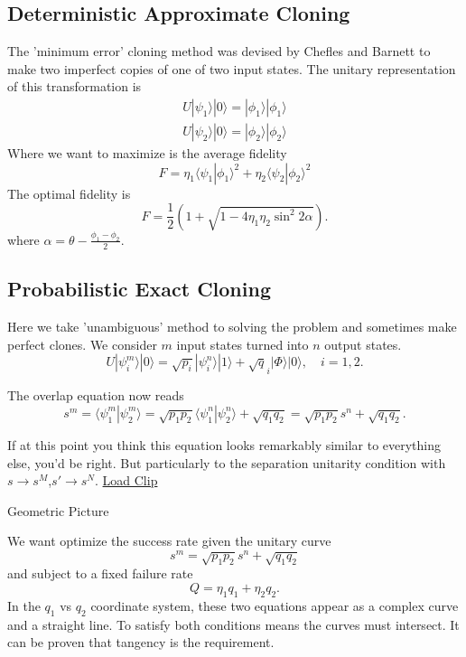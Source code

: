 \documentclass{beamer}
\newcommand{\ke}[1]{|#1\rangle}
\newcommand{\bk}[2]{\langle #1|#2\rangle}
\begin{document}
\subsection{Deterministic Approximate Cloning}
\begin{frame}
The 'minimum error' cloning method was devised by Chefles and Barnett to make two imperfect copies of one of two input states.
The unitary representation of this transformation is
\begin{eqnarray*}
U \ke{\psi_1}\ke 0  = \ke {\phi_1}\ke{\phi_1}\\
U \ke{\psi_2}\ke 0  = \ke {\phi_2}\ke{\phi_2}
\end{eqnarray*}
Where we want to maximize is the average fidelity
\[F = \eta_1 \bk{\psi_1}{\phi_1}^2 +\eta_2 \bk{\psi_2}{\phi_2}^2\]
The optimal fidelity is
\[F = \frac{1}{2}( 1 + \sqrt{1-  4 \eta_1 \eta_2 \sin^2 2\alpha}).\]
where $\alpha = \theta -\frac{\phi_1 - \phi_2}{2}$.
\end{frame}
\subsection{Probabilistic Exact Cloning}
\begin{frame}
Here we take 'unambiguous' method to solving the problem and sometimes make perfect clones.  We consider $m$ input states turned into $n$ output states.
\begin{equation*}
U|\psi^m_i\rangle|0\rangle= \sqrt{p_i}|\psi^n_i\rangle|1\rangle +\sqrt q_i |\Phi\rangle |0\rangle,\quad i=1,2. \label{Ui}
\end{equation*}

The overlap equation now reads 
\[s^m = \bk {\psi_1^m}{\psi_2^m} = \sqrt{p_1 p_2} \bk {\psi_1^n}{\psi_2^n}  + \sqrt{q_1 q_2} =\sqrt{p_1 p_2} s^n+ \sqrt{q_1 q_2}.\]

If at this point you think this equation looks remarkably similar to everything else, you'd be right. But particularly to the separation
 unitarity condition with $s \rightarrow s^M$,$s' \rightarrow s^N$.
\href{file:///C:/Users/Vadim/Documents/work/Final exam/manipulateUnitaryCondition.swf}{Load Clip}
\end{frame}


\begin{frame}{Geometric Picture}


We want optimize the success rate given the unitary curve
\[s^m=\sqrt{p_1 p_2} s^n+ \sqrt{q_1 q_2}\]
 and subject to a fixed failure rate 
\[Q = \eta_1 q_1 + \eta_2 q_2.\] 
In the $q_1$ vs $q_2$ coordinate system, these two equations appear as a complex curve and a straight line.  To satisfy both conditions means the curves must intersect.
It can be proven that tangency is the requirement. 
\end{frame}
\end{document}
